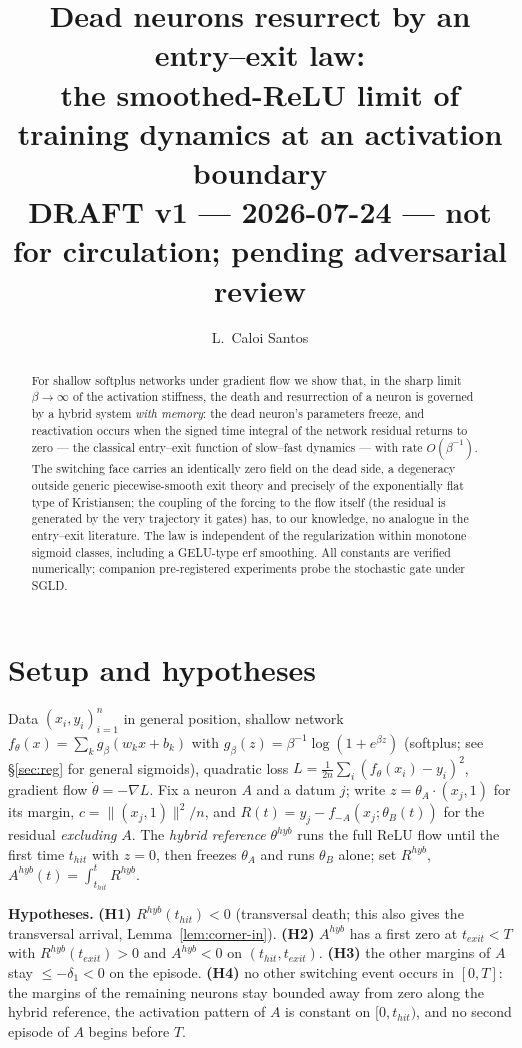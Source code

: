 \documentclass[11pt]{article}
\title{Dead neurons resurrect by an entry--exit law:\\ the smoothed-ReLU limit of
training dynamics at an activation boundary\\ \large DRAFT v1 --- 2026-07-24 ---
not for circulation; pending adversarial review}
\author{L.~Caloi Santos}
\date{}
\begin{document}
\maketitle

\begin{abstract}
For shallow softplus networks under gradient flow we show that, in the sharp
limit $\beta\to\infty$ of the activation stiffness, the death and resurrection
of a neuron is governed by a hybrid system \emph{with memory}: the dead
neuron's parameters freeze, and reactivation occurs when the signed time
integral of the network residual returns to zero --- the classical entry--exit
function of slow--fast dynamics --- with rate $O(\beta^{-1})$. The switching
face carries an identically zero field on the dead side, a degeneracy outside
generic piecewise-smooth exit theory and precisely of the exponentially flat
type of Kristiansen; the coupling of the forcing to the flow itself
(the residual is generated by the very trajectory it gates) has, to our
knowledge, no analogue in the entry--exit literature. The law is independent
of the regularization within monotone sigmoid classes, including a GELU-type erf smoothing. All constants are verified numerically;
companion pre-registered experiments probe the stochastic gate under SGLD.
\end{abstract}

\section{Setup and hypotheses}
Data $(x_i,y_i)_{i=1}^n$ in general position, shallow network
$f_\theta(x)=\sum_k g_\beta(w_kx+b_k)$ with $g_\beta(z)=\beta^{-1}\log(1+e^{\beta z})$
(softplus; see \S\ref{sec:reg} for general sigmoids), quadratic loss
$L=\tfrac1{2n}\sum_i(f_\theta(x_i)-y_i)^2$, gradient flow $\dot\theta=-\nabla L$.
Fix a neuron $A$ and a datum $j$; write $z=\theta_A\cdot(x_j,1)$ for its margin,
$c=\|(x_j,1)\|^2/n$, and $R(t)=y_j-f_{-A}(x_j;\theta_B(t))$ for the residual
\emph{excluding} $A$. The \emph{hybrid reference} $\theta^{hyb}$ runs the full
ReLU flow until the first time $t_{hit}$ with $z=0$, then freezes $\theta_A$ and
runs $\theta_B$ alone; set $R^{hyb}$, $A^{hyb}(t)=\int_{t_{hit}}^t R^{hyb}$.

\smallskip\noindent\textbf{Hypotheses.}
\textbf{(H1)} $R^{hyb}(t_{hit})<0$ (transversal death; this also gives the
transversal arrival, Lemma~\ref{lem:corner-in}).
\textbf{(H2)} $A^{hyb}$ has a first zero at $t_{exit}<T$ with
$R^{hyb}(t_{exit})>0$ and $A^{hyb}<0$ on $(t_{hit},t_{exit})$.
\textbf{(H3)} the other margins of $A$ stay $\le-\delta_1<0$ on the episode.
\textbf{(H4)} no other switching event occurs in $[0,T]$: the margins of the
remaining neurons stay bounded away from zero along the hybrid reference, the
activation pattern of $A$ is constant on $[0,t_{hit})$, and no second episode
of $A$ begins before $T$.
\end{document}
